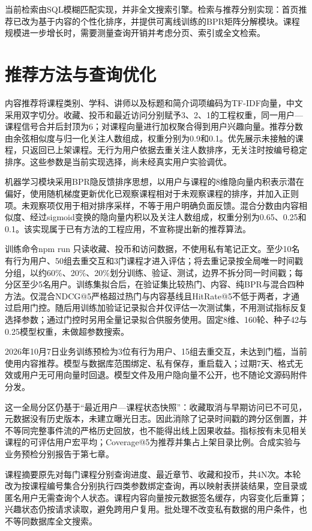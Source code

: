 \documentclass[UTF8,12pt,a4paper,oneside,openany]{ctexbook}
\begin{document}
当前检索由SQL模糊匹配实现，并非全文搜索引擎。检索与推荐分别实现：首页推荐已改为基于内容的个性化排序，并提供可离线训练的BPR矩阵分解模块。课程规模进一步增长时，需要测量查询开销并考虑分页、索引或全文检索。


\section{推荐方法与查询优化}

内容推荐将课程类别、学科、讲师以及标题和简介词项编码为TF-IDF向量，中文采用双字切分。收藏、投币和最近访问分别赋予3、2、1的工程权重，同一用户—课程信号合并后封顶为6；对课程向量进行加权聚合得到用户兴趣向量。推荐分数由余弦相似度与归一化关注人数组成，权重分别为0.9和0.1。优先展示未接触的课程，只返回已上架课程。无行为用户依据去重关注人数排序，无关注时按编号稳定排序。这些参数是当前实现选择，尚未经真实用户实验调优。


机器学习模块采用BPR隐反馈排序思想\cite{ref10}，以用户与课程的8维隐向量内积表示潜在偏好，使用随机梯度更新优化已观察课程相对于未观察课程的排序，并加入正则项。未观察项仅用于相对排序采样，不等于用户明确负面反馈。混合分数由内容相似度、经过sigmoid变换的隐向量内积以及关注人数组成，权重分别为0.65、0.25和0.1。该实现属于已有方法的工程应用，不宣称提出新的推荐算法。


训练命令npm run 只读收藏、投币和访问数据，不使用私有笔记正文。至少10名有行为用户、50组去重交互和3门课程才进入评估；将去重记录按全局唯一时间戳分组，以约60\%、20\%、20\%划分训练、验证、测试，边界不拆分同一时间戳；每分区至少5名用户。训练集拟合后，在验证集比较热门、内容、纯BPR与混合四种方法。仅混合NDCG@5严格超过热门与内容基线且HitRate@5不低于两者，才通过启用门控。随后用训练加验证记录拟合并仅评估一次测试集，不用测试指标反复选择参数；通过门控时另用全量记录拟合供服务使用。固定8维、160轮、种子42与0.25模型权重，未做超参数搜索。


2026年10月7日业务训练预检为3位有行为用户、15组去重交互，未达到门槛，当前使用内容推荐。模型与数据库范围绑定、私有保存，重启载入；过期7天、格式无效或用户无可用向量时回退。模型文件及用户隐向量不公开，也不随论文源码附件分发。


这一全局分区仍基于“最近用户—课程状态快照”：收藏取消与早期访问已不可见，元数据没有历史版本，未建立曝光日志。因此消除了记录时间戳的跨分区倒置，并不等同完整事件流的严格历史回放，也不能得出线上因果收益。指标按有未见相关课程的可评估用户宏平均；Coverage@5为推荐并集占上架目录比例。合成实验与业务预检分别报告于第七章。


课程摘要原先对每门课程分别查询进度、最近章节、收藏和投币，共4N次。本轮改为按课程编号集合分别执行四类参数绑定查询，再以映射表拼装结果，空目录或匿名用户无需查询个人状态。课程内容向量按元数据签名缓存，内容变化后重算；兴趣状态仍按请求读取，避免跨用户复用。批处理不改变私有数据的用户条件，也不等同数据库全文搜索。
\end{document}
